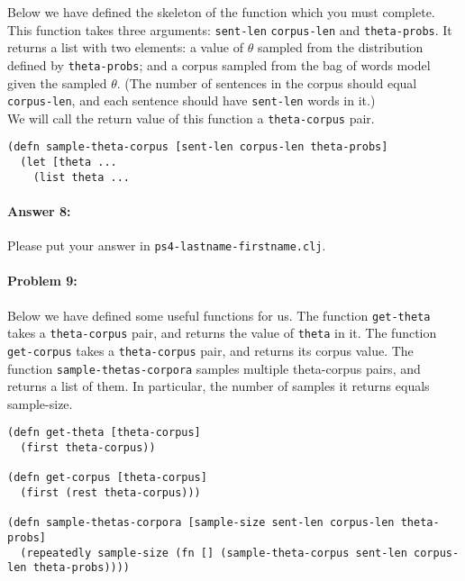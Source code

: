 \documentclass[10pt]{article}
\newcommand{\required}[1]{{\color{blue}{#1}}}
\newcommand{\PSnum}{4}
\begin{document}
Below we have defined the skeleton of the function
\required{\texttt{sample-theta-corpus}} which you must complete.  This
function takes three arguments: \texttt{sent-len} \texttt{corpus-len}
and \texttt{theta-probs}. It returns a list with two elements: a value
of $\theta$ sampled from the distribution defined by
\texttt{theta-probs}; and a corpus sampled from the bag of words model
given the sampled $\theta$. (The number of sentences in the corpus
should equal \texttt{corpus-len}, and each sentence should have
\texttt{sent-len} words in it.) \\

\noindent We will call the return value of this function a \texttt{theta-corpus} pair.

\begin{lstlisting}
(defn sample-theta-corpus [sent-len corpus-len theta-probs]
  (let [theta ...
    (list theta ...
\end{lstlisting}

\paragraph{Answer 8:} Please put your answer in
\texttt{ps\PSnum-lastname-firstname.clj}.

\noindent\hrulefill %

\paragraph{Problem 9:}

Below we have defined some useful functions for us. The function
\texttt{get-theta} takes a \texttt{theta-corpus} pair, and returns the
value of \texttt{theta} in it. The function \texttt{get-corpus} takes
a \texttt{theta-corpus} pair, and returns its corpus value. The
function \texttt{sample-thetas-corpora} samples multiple theta-corpus
pairs, and returns a list of them. In particular, the number of
samples it returns equals sample-size.

\begin{lstlisting}
(defn get-theta [theta-corpus]
  (first theta-corpus))

(defn get-corpus [theta-corpus]
  (first (rest theta-corpus)))
  
(defn sample-thetas-corpora [sample-size sent-len corpus-len theta-probs]
  (repeatedly sample-size (fn [] (sample-theta-corpus sent-len corpus-len theta-probs))))
\end{lstlisting}
\end{document}
